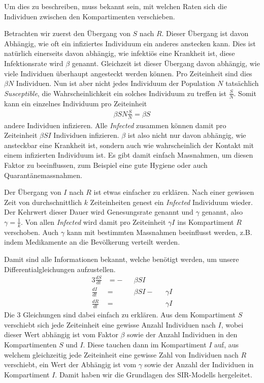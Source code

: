 \begin{refsection}
\begin{figure}[H]
  \centering
  
\end{figure}

Um dies zu beschreiben, muss bekannt sein, mit welchen Raten sich die Individuen zwischen den Kompartimenten verschieben.

Betrachten wir zuerst den Übergang von $S$ nach $R$.
Dieser Übergang ist davon Abhängig, wie oft ein infiziertes Individuum ein anderes anstecken kann.
Dies ist natürlich einerseits davon abhängig, wie infektiös eine Krankheit ist, diese Infektionsrate wird $\beta$ genannt.
Gleichzeit ist dieser Übergang davon abhängig, wie viele Individuen überhaupt angesteckt werden können. 
Pro Zeiteinheit sind dies $\beta N$ Individuen.
Nun ist aber nicht jedes Individuum der Population $N$ tatsächlich \emph{Susceptible}, die Wahrscheinlichkeit ein solches Individuum zu treffen ist $\frac{S}{N}$.
Somit kann ein einzelnes Individuum pro Zeiteinheit 
\begin{align*}
  \beta S N \frac{S}{N} = \beta S
\end{align*}
andere Individuen infizieren.
Alle \emph{Infected} zusammen können damit pro Zeiteinheit $\beta S I$ Individuen infizieren. 
$\beta$ ist also nicht nur davon abhängig, wie ansteckbar eine Krankheit ist, sondern auch wie wahrscheinlich der Kontakt mit einem infizierten Individuum ist. 
Es gibt damit einfach Massnahmen, um diesen Faktor zu beeinflussen, zum Beispiel eine gute Hygiene oder auch Quarantänemassnahmen.

Der Übergang von $I$ nach $R$ ist etwas einfacher zu erklären. 
Nach einer gewissen Zeit von durchschnittlich $k$ Zeiteinheiten genest ein \emph{Infected} Individuum wieder.
Der Kehrwert dieser Dauer wird Genesungsrate genannt und $\gamma$ genannt, also $\gamma = \frac{1}{k}$.
Von allen \emph{Infected} wird damit pro Zeiteinheit $\gamma I$ ins Kompartiment $R$ verschoben.
Auch $\gamma$ kann mit bestimmten Massnahmen beeinflusst werden, z.B. indem Medikamente an die Bevölkerung verteilt werden.

Damit sind alle Informationen bekannt, welche benötigt werden, um unsere Differentialgleichungen aufzustellen. 
\begin{alignat*}{3}
  \frac{dS}{dt} & = - && \beta S I  \\
  \frac{dI}{dt} & =   && \beta S I - && \gamma I \\
  \frac{dR}{dt} & =   &&             && \gamma I 
\end{alignat*}
Die 3 Gleichungen sind dabei einfach zu erklären. 
Aus dem Kompartiment $S$ verschiebt sich jede Zeiteinheit eine gewisse Anzahl Individuen nach $I$, wobei dieser Wert abhängig ist vom Faktor $\beta$ sowie der Anzahl Individuen in den Kompartimenten $S$ und $I$.
Diese tauchen dann im Kompartiment $I$ auf, aus welchem gleichzeitig jede Zeiteinheit eine gewisse Zahl von Individuen nach $R$ verschiebt, ein Wert der Abhängig ist vom $\gamma$ sowie der Anzahl der Individuen in Kompartiment $I$. 
Damit haben wir die Grundlagen des SIR-Modells hergeleitet. 


\end{refsection}
